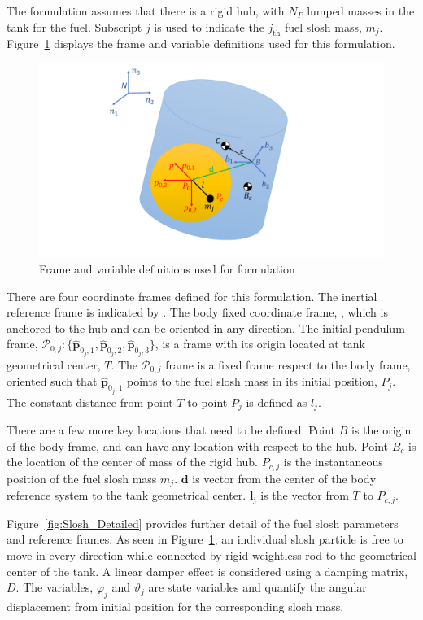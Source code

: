 \documentclass[]{BasiliskReportMemo}
\begin{document}
	The formulation assumes that there is a rigid hub, with $N_P$ lumped masses in the tank for the fuel. Subscript $j$ is used to indicate the $j_\text{th}$ fuel slosh mass, $m_j$. Figure~\ref{fig:Slosh_Figure} displays the frame and variable definitions used for this formulation.

	\begin{figure}[ht]
		\centering
		\includegraphics[width=13cm]{Figures/spacecraft.pdf}
		\caption{Frame and variable definitions used for formulation}
		\label{fig:Slosh_Figure}
	\end{figure} 
	
	There are four coordinate frames defined for this formulation. The inertial reference frame is indicated by . The body fixed coordinate frame, , which is anchored to the hub and can be oriented in any direction. The initial pendulum frame, $\mathcal{P}_{0,j}:\{\hat{\bm p}_{0_j,1},\hat{\bm p}_{0_j,2},\hat{\bm p}_{0_j,3}\}$, is a frame with its origin located at tank geometrical center, $T$. The $\mathcal{P}_{0,j}$ frame is a fixed frame respect to the body frame, oriented such that $\hat{\bm{p}}_{0_j,1}$ points to the fuel slosh mass in its initial position, $P_{j}$. The constant distance from point $T$ to point $P_{j}$ is defined as $l_j$. 
	
	There are a few more key locations that need to be defined. Point $B$ is the origin of the body frame, and can have any location with respect to the hub. Point $B_c$ is the location of the center of mass of the rigid hub. $P_{c,j}$ is the instantaneous position of the fuel slosh mass $m_j$. $\bm{d}$ is vector from the center of the body reference system to the tank geometrical center. $\bm{l_j}$ is the vector from $T$ to $P_{c,j}$.
	
	Figure~\ref{fig:Slosh_Detailed} provides further detail of the fuel slosh parameters and reference frames. As seen in Figure~\ref{fig:Slosh_Figure}, an individual slosh particle is free to move in every direction while connected by rigid weightless rod to the geometrical center of the tank. A linear damper effect is considered using a damping matrix, $D$. The variables, $\varphi_j$ and $\vartheta_j$ are state variables and quantify the angular displacement from initial position for the corresponding slosh mass. 
	
\end{document}
